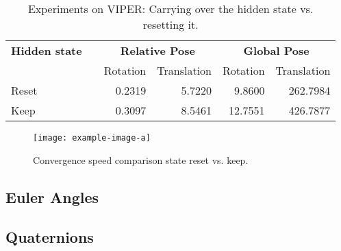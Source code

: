 		\begin{table}[tb]
			\small
			\begin{center}
				\begin{tabular}{lcrrrr}
					\toprule
					\textbf{Hidden state} & & \multicolumn{2}{c}{\textbf{Relative Pose}} & \multicolumn{2}{c}{\textbf{Global Pose}} \\
					& & Rotation & Translation & Rotation & Translation \\
					\midrule
					Reset 		& 			& 0.2319	& 5.7220	& 9.8600	& 262.7984		\\ 
					Keep		&			& 0.3097	& 8.5461	& 12.7551	& 426.7877		\\
					\bottomrule
				\end{tabular}
			\end{center}
			\caption[Experiments on VIPER: Carrying over the hidden state vs. resetting it]
					{Experiments on VIPER: Carrying over the hidden state vs. resetting it.
					 \label{tbl:kitti-removing-lstm}}
		\end{table}
	
		\begin{figure}
			\centering
			\texttt{[image: example-image-a]}
			\caption{Convergence speed comparison state reset vs. keep.}
		\end{figure}
		
		\subsection{Euler Angles}
		
		\subsection{Quaternions}

